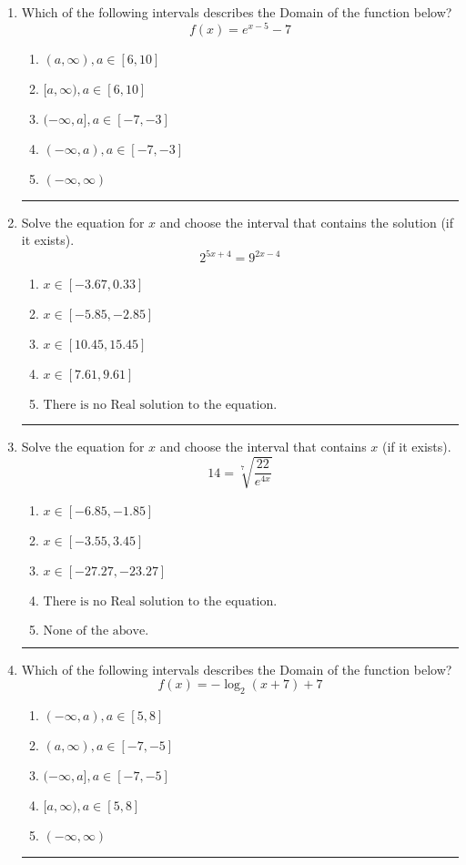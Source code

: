 \documentclass[14pt]{extbook}
\newcommand{\litem}[1]{\item#1\hspace*{-1cm}\rule{\textwidth}{0.4pt}}
\begin{document}
\begin{enumerate}
{\begin{enumerate}[label=\Alph*.]
\end{enumerate} }
\litem{
Which of the following intervals describes the Domain of the function below?\[ f(x) = e^{x-5}-7 \]\begin{enumerate}[label=\Alph*.]
\item \( (a, \infty), a \in [6, 10] \)
\item \( [a, \infty), a \in [6, 10] \)
\item \( (-\infty, a], a \in [-7, -3] \)
\item \( (-\infty, a), a \in [-7, -3] \)
\item \( (-\infty, \infty) \)

\end{enumerate} }
\litem{
Solve the equation for $x$ and choose the interval that contains the solution (if it exists).\[ 2^{5x+4} = 9^{2x-4} \]\begin{enumerate}[label=\Alph*.]
\item \( x \in [-3.67, 0.33] \)
\item \( x \in [-5.85, -2.85] \)
\item \( x \in [10.45, 15.45] \)
\item \( x \in [7.61, 9.61] \)
\item \( \text{There is no Real solution to the equation.} \)

\end{enumerate} }
\litem{
 Solve the equation for $x$ and choose the interval that contains $x$ (if it exists).\[  14 = \sqrt[7]{\frac{22}{e^{4x}}} \]\begin{enumerate}[label=\Alph*.]
\item \( x \in [-6.85, -1.85] \)
\item \( x \in [-3.55, 3.45] \)
\item \( x \in [-27.27, -23.27] \)
\item \( \text{There is no Real solution to the equation.} \)
\item \( \text{None of the above.} \)

\end{enumerate} }
\litem{
Which of the following intervals describes the Domain of the function below?\[ f(x) = -\log_2{(x+7)}+7 \]\begin{enumerate}[label=\Alph*.]
\item \( (-\infty, a), a \in [5, 8] \)
\item \( (a, \infty), a \in [-7, -5] \)
\item \( (-\infty, a], a \in [-7, -5] \)
\item \( [a, \infty), a \in [5, 8] \)
\item \( (-\infty, \infty) \)


\end{enumerate}}
\end{enumerate}
\end{document}
